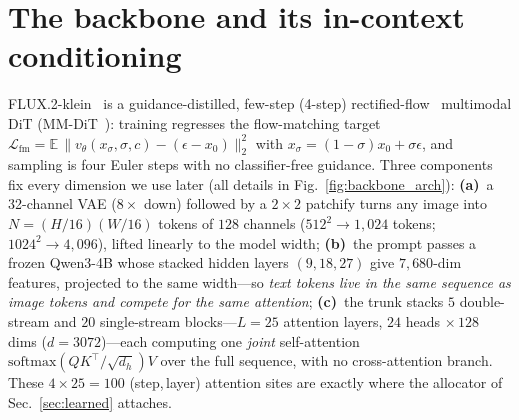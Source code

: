 \begin{table}[t]\centering\small
\setlength{\tabcolsep}{5pt}
\caption[Terminology]{\textbf{Terminology} used throughout this chapter and the experiments.}
\label{tab:terms}
\end{table}

\section{The backbone and its in-context conditioning}
\label{sec:backbone}
FLUX.2-klein~\cite{flux2} is a guidance-distilled, few-step (4-step)
rectified-flow~\cite{rectifiedflow,flowmatching} multimodal DiT (MM-DiT~\cite{sd3}):
training regresses the flow-matching target
$\mathcal{L}_{\mathrm{fm}}=\mathbb{E}\,\lVert v_\theta(x_\sigma,\sigma,c)-(\epsilon-x_0)\rVert_2^2$
with $x_\sigma=(1-\sigma)x_0+\sigma\epsilon$, and sampling is four Euler steps
with no classifier-free guidance. Three components fix every dimension we use
later (all details in Fig.~\ref{fig:backbone_arch}): \textbf{(a)}~a 32-channel
VAE ($8\times$ down) followed by a $2{\times}2$ patchify turns any image into
$N{=}(H/16)(W/16)$ tokens of $128$ channels ($512^2\!\rightarrow\!1{,}024$
tokens; $1024^2\!\rightarrow\!4{,}096$), lifted linearly to the model width;
\textbf{(b)}~the prompt passes a frozen Qwen3-4B whose stacked hidden layers
$(9,18,27)$ give $7{,}680$-dim features, projected to the same width---so
\emph{text tokens live in the same sequence as image tokens and compete for the
same attention}; \textbf{(c)}~the trunk stacks $5$ double-stream and $20$
single-stream blocks---$L{=}25$ attention layers, $24$ heads $\times\,128$ dims
($d{=}3072$)---each computing one \emph{joint} self-attention
$\mathrm{softmax}(QK^{\!\top}/\sqrt{d_h})V$ over the full sequence, with no
cross-attention branch. These $4\times25=100$ (step,\,layer) attention sites are
exactly where the allocator of Sec.~\ref{sec:learned} attaches.

